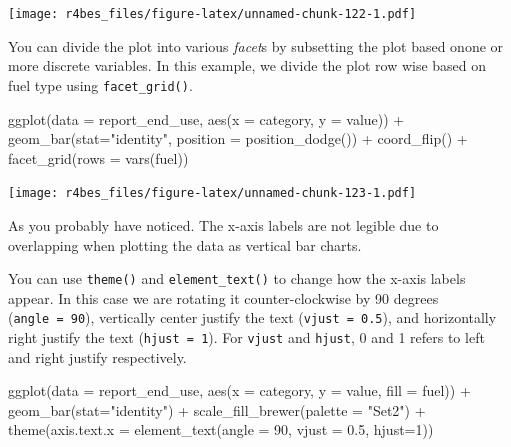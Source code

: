 \documentclass[
]{book}
\newenvironment{Shaded}{\begin{snugshade}}{\end{snugshade}}
\newcommand{\AttributeTok}[1]{\textcolor[rgb]{0.77,0.63,0.00}{#1}}
\newcommand{\DecValTok}[1]{\textcolor[rgb]{0.00,0.00,0.81}{#1}}
\newcommand{\FloatTok}[1]{\textcolor[rgb]{0.00,0.00,0.81}{#1}}
\newcommand{\FunctionTok}[1]{\textcolor[rgb]{0.00,0.00,0.00}{#1}}
\newcommand{\NormalTok}[1]{#1}
\newcommand{\SpecialCharTok}[1]{\textcolor[rgb]{0.00,0.00,0.00}{#1}}
\newcommand{\StringTok}[1]{\textcolor[rgb]{0.31,0.60,0.02}{#1}}
\begin{document}
\texttt{[image: r4bes\_files/figure-latex/unnamed-chunk-122-1.pdf]}

You can divide the plot into various \emph{facet}s by subsetting the plot based onone or more discrete variables. In this example, we divide the plot row wise based on fuel type using \texttt{facet\_grid()}.

\begin{Shaded}
\begin{Highlighting}[]
\FunctionTok{ggplot}\NormalTok{(}\AttributeTok{data =}\NormalTok{ report\_end\_use, }\FunctionTok{aes}\NormalTok{(}\AttributeTok{x =}\NormalTok{ category, }\AttributeTok{y =}\NormalTok{ value)) }\SpecialCharTok{+}
    \FunctionTok{geom\_bar}\NormalTok{(}\AttributeTok{stat=}\StringTok{"identity"}\NormalTok{, }\AttributeTok{position =} \FunctionTok{position\_dodge}\NormalTok{()) }\SpecialCharTok{+} 
    \FunctionTok{coord\_flip}\NormalTok{() }\SpecialCharTok{+}
    \FunctionTok{facet\_grid}\NormalTok{(}\AttributeTok{rows =} \FunctionTok{vars}\NormalTok{(fuel))}
\end{Highlighting}
\end{Shaded}

\texttt{[image: r4bes\_files/figure-latex/unnamed-chunk-123-1.pdf]}

As you probably have noticed. The x-axis labels are not legible due to overlapping when plotting the data as vertical bar charts.

You can use \texttt{theme()} and \texttt{element\_text()} to change how the x-axis labels appear. In this case we are rotating it counter-clockwise by 90 degrees (\texttt{angle\ =\ 90}), vertically center justify the text (\texttt{vjust\ =\ 0.5}), and horizontally right justify the text (\texttt{hjust\ =\ 1}). For \texttt{vjust} and \texttt{hjust}, 0 and 1 refers to left and right justify respectively.

\begin{Shaded}
\begin{Highlighting}[]
\FunctionTok{ggplot}\NormalTok{(}\AttributeTok{data =}\NormalTok{ report\_end\_use, }\FunctionTok{aes}\NormalTok{(}\AttributeTok{x =}\NormalTok{ category, }\AttributeTok{y =}\NormalTok{ value, }\AttributeTok{fill =}\NormalTok{ fuel)) }\SpecialCharTok{+}
    \FunctionTok{geom\_bar}\NormalTok{(}\AttributeTok{stat=}\StringTok{"identity"}\NormalTok{) }\SpecialCharTok{+} 
    \FunctionTok{scale\_fill\_brewer}\NormalTok{(}\AttributeTok{palette =} \StringTok{"Set2"}\NormalTok{) }\SpecialCharTok{+}
    \FunctionTok{theme}\NormalTok{(}\AttributeTok{axis.text.x =} \FunctionTok{element\_text}\NormalTok{(}\AttributeTok{angle =} \DecValTok{90}\NormalTok{, }\AttributeTok{vjust =} \FloatTok{0.5}\NormalTok{, }\AttributeTok{hjust=}\DecValTok{1}\NormalTok{))}
\end{Highlighting}
\end{Shaded}
\end{document}
